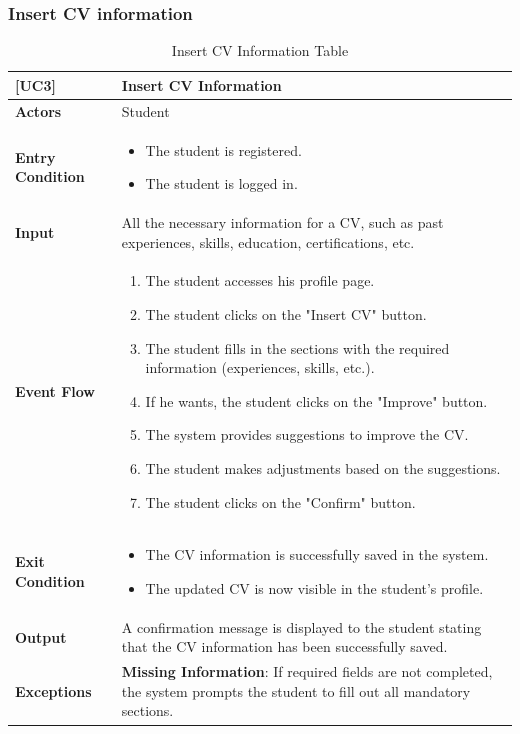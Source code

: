\subsubsection*{Insert CV information}
\begin{table}[H]
    \centering
    \renewcommand{\arraystretch}{1.5}
    \begin{tabular}{|p{4cm}|p{11cm}|}
    \hline
    \rowcolor{bluepoli!40}
    \textbf{[UC3]} & \textbf{Insert CV Information} \\ \hline \hline
    \textbf{Actors} & Student \\ \hline
    \textbf{Entry Condition} & 
    {\setlength{\leftmargini}{1.1em}
    \begin{itemize}
        \item The student is registered.
        \item The student is logged in.
    \end{itemize}} \\ \hline
    \textbf{Input} & 
    All the necessary information for a CV, such as past experiences, skills, education, certifications, etc. \\ \hline
    \textbf{Event Flow} & 
    {\setlength{\leftmargini}{1.4em}
    \begin{enumerate}
        \item The student accesses his profile page.
        \item The student clicks on the "Insert CV" button.
        \item The student fills in the sections with the required information (experiences, skills, etc.).
        \item If he wants, the student clicks on the "Improve" button.
        \item The system provides suggestions to improve the CV.
        \item The student makes adjustments based on the suggestions.
        \item The student clicks on the "Confirm" button.
    \end{enumerate}} \\ \hline
    \textbf{Exit Condition} & 
    {\setlength{\leftmargini}{1.1em}
    \begin{itemize}
        \item The CV information is successfully saved in the system.
        \item The updated CV is now visible in the student's profile.
    \end{itemize}} \\ \hline
    \textbf{Output} & 
    A confirmation message is displayed to the student stating that the CV information has been successfully saved. \\ \hline
    \textbf{Exceptions} & 
    \textbf{Missing Information}: If required fields are not completed, the system prompts the student to fill out all mandatory sections. \\ \hline
    \end{tabular}
    \label{table:example}
    \caption{Insert CV Information Table}
\end{table}

